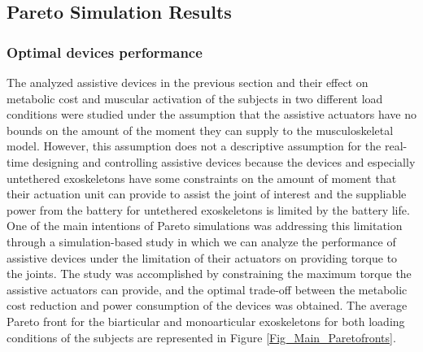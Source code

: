 \documentclass[10pt,letterpaper]{article}
\begin{document}
\subsection*{Pareto Simulation Results}
\subsubsection*{Optimal devices performance}
The analyzed assistive devices in the previous section and their effect on metabolic cost and muscular activation of the subjects in two different load conditions were studied under the assumption that the assistive actuators have no bounds on the amount of the moment they can supply to the musculoskeletal model. However, this assumption does not a descriptive assumption for the real-time designing and controlling assistive devices because the devices and especially untethered exoskeletons have some constraints on the amount of moment that their actuation unit can provide to assist the joint of interest and the suppliable power from the battery for untethered exoskeletons is limited by the battery life. \\
One of the main intentions of Pareto simulations was addressing this limitation through a simulation-based study in which we can analyze the performance of assistive devices under the limitation of their actuators on providing torque to the joints. 
The study was accomplished by constraining the maximum torque the assistive actuators can provide, and the optimal trade-off between the metabolic cost reduction and power consumption of the devices was obtained. The average Pareto front for the biarticular and monoarticular exoskeletons for both loading conditions of the subjects are represented in Figure \ref{Fig_Main_Paretofronts}.\\
\end{document}
